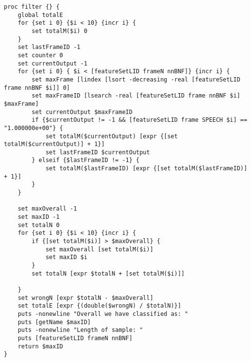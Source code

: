 \begin{lstlisting}[label=lst:SpeechFilter,caption=Speech Filter employed to smooth/improve output]
proc filter {} {
    global totalE
    for {set i 0} {$i < 10} {incr i} {
        set totalM($i) 0
    }
    set lastFrameID -1
    set counter 0
    set currentOutput -1
    for {set i 0} { $i < [featureSetLID frameN nnBNF]} {incr i} {
        set maxFrame [lindex [lsort -decreasing -real [featureSetLID frame nnBNF $i]] 0]
        set maxFrameID [lsearch -real [featureSetLID frame nnBNF $i] $maxFrame]
        set currentOutput $maxFrameID
        if {$currentOutput != -1 && [featureSetLID frame SPEECH $i] == "1.000000e+00"} {
            set totalM($currentOutput) [expr {[set totalM($currentOutput)] + 1}]
            set lastFrameID $currentOutput
        } elseif {$lastFrameID != -1} {
            set totalM($lastFrameID) [expr {[set totalM($lastFrameID)] + 1}]
        }
    }

    set maxOverall -1
    set maxID -1
    set totalN 0
    for {set i 0} {$i < 10} {incr i} {
        if {[set totalM($i)] > $maxOverall} {
            set maxOverall [set totalM($i)]
            set maxID $i
        }
        set totalN [expr $totalN + [set totalM($i)]]

    }
    set wrongN [expr $totalN - $maxOverall]
    set totalE [expr {(double($wrongN) / $totalN)}]
    puts -nonewline "Overall we have classified as: "
    puts [getName $maxID]
    puts -nonewline "Length of sample: "
    puts [featureSetLID frameN nnBNF]
    return $maxID
}
\end{lstlisting}

